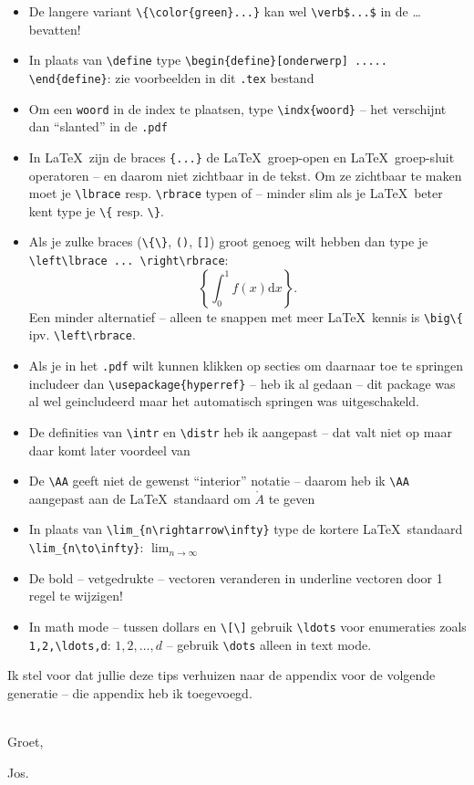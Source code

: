 \documentclass{2wa40summary}
\begin{document}
\begin{itemize}
		\item De langere variant \verb$\{\color{green}...}$ kan wel \verb#\verb$...$# in de \dots bevatten!
		\item In plaats van \verb$\define$ type \verb$\begin{define}[onderwerp] ..... \end{define}$: zie voorbeelden in dit \verb$.tex$ bestand
		\item Om een \verb$woord$ in de index te plaatsen, type \verb$\indx{woord}$ -- het verschijnt dan ``slanted'' in de \verb$.pdf$
		\item In \LaTeX\ zijn de braces \verb${...}$ de \LaTeX\ groep-open en \LaTeX\ groep-sluit operatoren -- en daarom niet zichtbaar in de tekst. Om ze zichtbaar te maken moet je \verb$\lbrace$ resp.{} \verb$\rbrace$ typen of -- minder slim als je \LaTeX\ beter kent type je \verb$\{$ resp.{} \verb$\}$.
		\item Als je zulke braces (\verb$\{\}$, \verb$()$, \verb$[]$) groot genoeg wilt hebben dan type je \verb$\left\lbrace ... \right\rbrace$:
		\[
		\left\lbrace \int_0^1 f(x) \text{d}x \right\rbrace.
		\]
		Een minder alternatief -- alleen te snappen met meer \LaTeX\ kennis is \verb$\big\{$ ipv.{} \verb$\left\rbrace$.
		\item Als je in het \verb$.pdf$ wilt kunnen klikken op secties om daarnaar toe te springen includeer dan
		\verb$\usepackage{hyperref}$ -- heb ik al gedaan -- dit package was al wel geincludeerd maar het automatisch springen was uitgeschakeld.
		\item De definities van \verb$\intr$ en \verb$\distr$ heb ik aangepast -- dat valt niet op maar daar komt later voordeel van
		\item De \verb$\AA$ geeft niet de gewenst ``interior'' notatie -- daarom heb ik \verb$\AA$ aangepast aan de \LaTeX\ standaard
		om $\mathring{A}$ te geven
		\item In plaats van \verb$\lim_{n\rightarrow\infty}$ type de kortere \LaTeX\ standaard \verb$\lim_{n\to\infty}$: $\lim_{n\to\infty}$
		\item De bold -- vetgedrukte -- vectoren veranderen in underline vectoren door 1 regel te wijzigen!
		\item In math mode -- tussen dollars en \verb$\[\]$ gebruik \verb$\ldots$ voor enumeraties zoals \verb$1,2,\ldots,d$: $1,2,\ldots,d$ -- gebruik \verb$\dots$ alleen in text mode.
	\end{itemize}
	Ik stel voor dat jullie deze tips verhuizen naar de appendix voor de volgende generatie -- die appendix heb ik toegevoegd.
	
	\ \\
	Groet,
	
	Jos.
\end{document}
